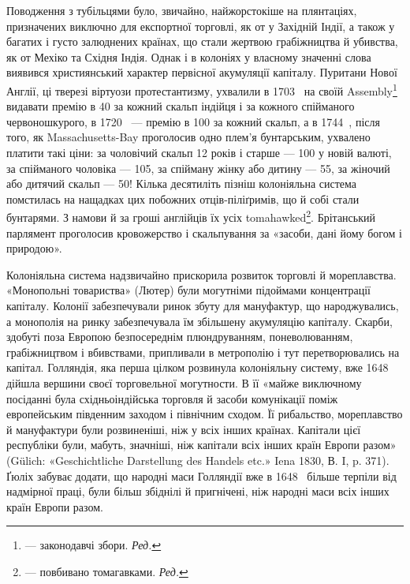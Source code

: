 Поводження з тубільцями було, звичайно, найжорстокіше
на плянтаціях, призначених виключно для експортної торговлі,
як от у Західній Індії, а також у багатих і густо залюднених
країнах, що стали жертвою грабіжництва й убивства, як от Мехіко
та Східня Індія. Однак і в колоніях у власному значенні
слова виявився християнський характер первісної акумуляції
капіталу. Пуритани Нової Англії, ці тверезі віртуози протестантизму,
ухвалили в 1703~ на своїй Assembly\footnote*{
— законодавчі збори. \emph{Ред.}
} видавати премію
в 40 за кожний скальп індійця і за кожного
спійманого червоношкурого, в 1720~ — премію в 100 за кожний скальп, а в 1744~, після того, як Massachusetts-Bay
проголосив одно плем’я бунтарським, ухвалено платити
такі ціни: за чоловічий скальп 12 років і старше — 100 у
новій валюті, за спійманого чоловіка — 105, за спійману
жінку або дитину — 55, за
жіночий або дитячий скальп — 50!
Кілька десятиліть пізніш колоніяльна система помстилась на нащадках
цих побожних отців-піліґримів,
що й собі стали бунтарями. З намови й за гроші англійців їх усіх
tomahawked\footnote*{
— повбивано томагавками. \emph{Ред.}
}. Брітанський парлямент
проголосив кровожерство і скальпування
за «засоби, дані йому богом і природою».

Колоніяльна система надзвичайно прискорила розвиток торговлі й мореплавства. «Монопольні товариства»
(Лютер) були могутніми підоймами концентрації капіталу. Колонії забезпечували ринок збуту для
мануфактур, що народжувались, а монополія на ринку забезпечувала їм збільшену акумуляцію капіталу.
Скарби, здобуті поза Европою безпосереднім плюндруванням, поневолюванням, грабіжництвом і
вбивствами, припливали в метрополію і тут перетворювались на капітал. Голляндія, яка перша цілком
розвинула колоніяльну систему, вже 1648~ дійшла вершини своєї торговельної могутности. В її «майже
виключному посіданні була східньоіндійська торговля й засоби
комунікації поміж европейським південним заходом і північним сходом. Її рибальство, мореплавство й
мануфактури були розвиненіші, ніж у всіх інших країнах. Капітали цієї республіки були, мабуть,
значніші, ніж капітали всіх інших країн Европи разом» (Gülich: «Geschichtliche Darstellung des
Handels etc.» Iena 1830, В. I, p. 371). Ґюліх забуває додати, що народні маси Голляндії вже в 1648~ більше терпіли від надмірної праці, були більш збіднілі й пригнічені, ніж народні маси всіх інших
країн Европи разом.

